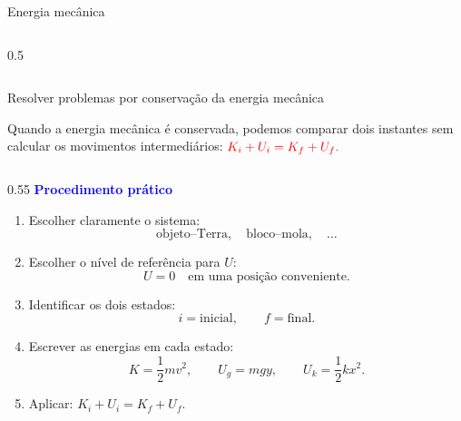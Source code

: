 \documentclass{beamer}
\begin{document}
\begin{frame}{Energia mecânica}
\begin{columns}[T]
\begin{column}{0.5\textwidth}
			\end{column}
		\end{columns}
		
	\end{frame}
	
	\begin{frame}{Resolver problemas por conservação da energia mecânica}
		\scriptsize
		
		Quando a energia mecânica é conservada, podemos comparar dois instantes sem calcular os movimentos intermediários:
		$
		\textcolor{red}{K_i+U_i=K_f+U_f.}
		$
		
		\begin{columns}[T]
			\begin{column}{0.55\textwidth}
				\textcolor{blue}{\textbf{Procedimento prático}}
				
				\begin{enumerate}
					\item Escolher claramente o sistema:
					\[
					\text{objeto--Terra},\quad \text{bloco--mola},\quad \ldots
					\]
					
					\item Escolher o nível de referência para \(U\):
					\[
					U=0 \quad \text{em uma posição conveniente.}
					\]
					
					\item Identificar os dois estados:
					\[
					i=\text{inicial}, \qquad f=\text{final}.
					\]
					
					\item Escrever as energias em cada estado:
					\[
					K=\frac12mv^2, \qquad U_g=mgy, \qquad U_k=\frac12kx^2.
					\]
					
					\item Aplicar:
					$
					K_i+U_i=K_f+U_f.
					$
				\end{enumerate}
			\end{column}
			

\end{columns}
\end{frame}
\end{document}
